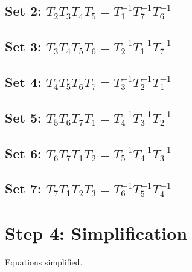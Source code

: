 \documentclass[12pt, a4paper]{article}
\begin{document}
\subsection*{Set 2: $T_{2}T_{3}T_{4}T_{5} = T_{1}^{-1}T_{7}^{-1}T_{6}^{-1}$}
\subsection*{Set 3: $T_{3}T_{4}T_{5}T_{6} = T_{2}^{-1}T_{1}^{-1}T_{7}^{-1}$}
\subsection*{Set 4: $T_{4}T_{5}T_{6}T_{7} = T_{3}^{-1}T_{2}^{-1}T_{1}^{-1}$}
\subsection*{Set 5: $T_{5}T_{6}T_{7}T_{1} = T_{4}^{-1}T_{3}^{-1}T_{2}^{-1}$}
\subsection*{Set 6: $T_{6}T_{7}T_{1}T_{2} = T_{5}^{-1}T_{4}^{-1}T_{3}^{-1}$}
\subsection*{Set 7: $T_{7}T_{1}T_{2}T_{3} = T_{6}^{-1}T_{5}^{-1}T_{4}^{-1}$}


\section{Step 4: Simplification}
Equations simplified.
\end{document}
